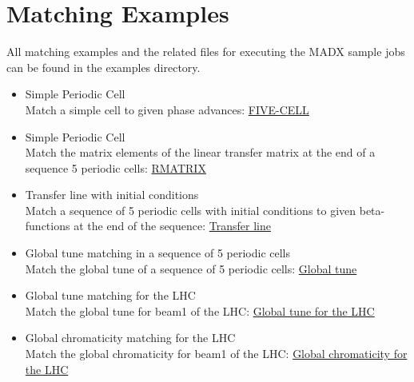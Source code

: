 


%
 
\section{Matching Examples}
\label{sec:match-examples}

All matching examples and the related files for executing the MADX
sample jobs can be found in the examples directory. 
\begin{itemize}
	\item Simple Periodic Cell\\
	Match a simple cell to given phase advances: 
        \href{http://cern.ch/madx/madX/examples/match/5cell/job.5cell.madx}{FIVE-CELL}

	\item Simple Periodic Cell\\
	Match the matrix elements of the linear transfer matrix at the
        end of a sequence 5 periodic cells:  
        \href{http://cern.ch/madx/madX/examples/match/r-matrix/job.r-matrix.madx}{RMATRIX}

	\item Transfer line with initial conditions\\
	Match a sequence of 5 periodic cells with initial conditions  to
        given beta-functions at the end of the sequence:  
        \href{http://cern.ch/madx/madX/examples/match/line/job.line.madx}{Transfer line}

	\item Global tune matching in a sequence of 5 periodic cells \\
	Match the global tune of a sequence of 5 periodic cells: 
        \href{http://cern.ch/madx/madX/examples/match/global-tune/job.global-tune.madx}{Global tune}
	
	\item Global tune matching for the LHC\\
	Match the global tune for beam1 of the LHC: 
        \href{http://cern.ch/madx/madX/examples/match/lhc.tune/job.lhc.tune.madx}{Global tune for the LHC}
	
	\item Global chromaticity matching for the LHC\\
	Match the global chromaticity for beam1 of the LHC: 
        \href{http://cern.ch/madx/madX/examples/match/lhc.chromaticity/job.lhc.chromaticity.madx}{Global
          chromaticity for the LHC} 


\end{itemize}
